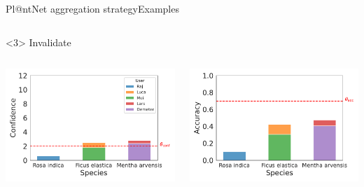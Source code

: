 \begin{frame}{Pl@ntNet aggregation strategy}{Examples}
\begin{onlyenv}
\begin{columns}
\begin{column}{.5\textwidth}
\begin{center}
                \end{center}
            \end{column}
        \end{columns}
    \end{onlyenv}
    \begin{onlyenv}<3>
        Invalidate
        \begin{columns}
            \begin{column}{.5\textwidth}
                \begin{center}
                    \includegraphics[width=\textwidth]{./images/histplot_conf_invalidate.pdf}
                \end{center}
            \end{column}
            \begin{column}{.5\textwidth}
                \begin{center}
                    \includegraphics[width=\textwidth]{./images/histplot_acc_invalidate.pdf}
                \end{center}
            \end{column}
        \end{columns}
    \end{onlyenv}
\end{frame}

